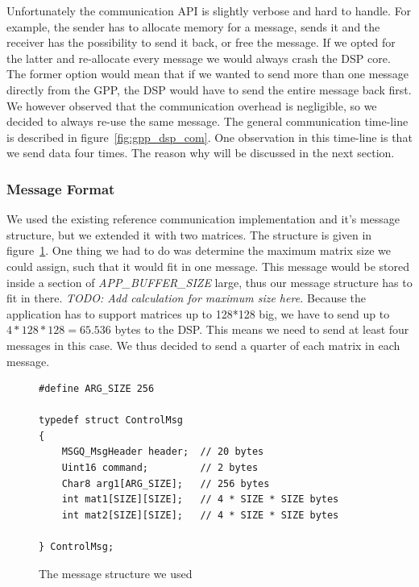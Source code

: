Unfortunately the communication API is slightly verbose and hard to handle.
For example, the sender has to allocate memory for a message, sends it and the
receiver has the possibility to send it back, or free the message. If we opted
for the latter and re-allocate every message we would always crash the DSP core.
The former option would mean that if we wanted to send more than one message
directly from the GPP, the DSP would have to send the entire message back first.
We however observed that the communication overhead is negligible, so we
decided to always re-use the same message. The general communication time-line
is described in figure~\ref{fig:gpp_dsp_com}. One observation in this time-line
is that we send data four times. The reason why will be discussed in the next
section.

\subsubsection{Message Format}
We used the existing reference communication implementation and it's message
structure, but we extended it with two matrices. The structure is given in 
figure~\ref{code:control_msg}. One thing we had to do was determine the maximum
matrix size we could assign, such that it would fit in one message. This
message would be stored inside a section of \emph{APP\_BUFFER\_SIZE} large, thus
our message structure has to fit in there. 
\emph{TODO: Add calculation for maximum size here.}
Because the application has to support matrices up to 128*128 big, we have to
send up to $4*128*128 = 65.536$ bytes to the DSP. This means we need to send
at least four messages in this case. We thus decided to send a quarter of each 
matrix in each message.

\begin{figure}[h]
\begin{lstlisting}
#define ARG_SIZE 256

typedef struct ControlMsg
{
    MSGQ_MsgHeader header;	// 20 bytes
    Uint16 command;			// 2 bytes
    Char8 arg1[ARG_SIZE];	// 256 bytes
    int mat1[SIZE][SIZE];	// 4 * SIZE * SIZE bytes
    int mat2[SIZE][SIZE];	// 4 * SIZE * SIZE bytes

} ControlMsg;
\end{lstlisting}
\caption{The message structure we used}
\label{code:control_msg}
\end{figure}
